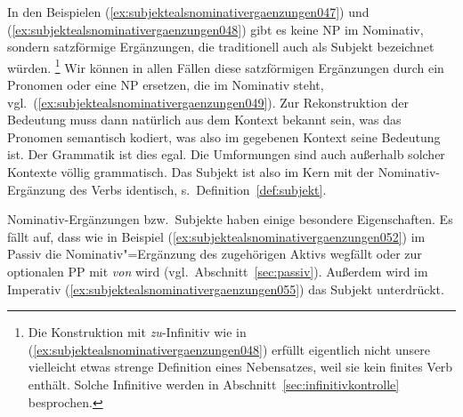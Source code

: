 In den Beispielen (\ref{ex:subjektealsnominativergaenzungen047}) und (\ref{ex:subjektealsnominativergaenzungen048}) gibt es keine NP im Nominativ, sondern satzförmige Ergänzungen, die traditionell auch als Subjekt bezeichnet würden.%
\footnote{Die Konstruktion mit \textit{zu}-Infinitiv wie in (\ref{ex:subjektealsnominativergaenzungen048}) erfüllt eigentlich nicht unsere vielleicht etwas strenge Definition eines Nebensatzes, weil sie kein finites Verb enthält.
Solche Infinitive werden in Abschnitt~\ref{sec:infinitivkontrolle} besprochen.}
Wir können in allen Fällen diese satzförmigen Ergänzungen durch ein Pronomen oder eine NP ersetzen, die im Nominativ steht, vgl.\ (\ref{ex:subjektealsnominativergaenzungen049}).
Zur Rekonstruktion der Bedeutung muss dann natürlich aus dem Kontext bekannt sein, was das Pronomen semantisch kodiert, was also im gegebenen Kontext seine Bedeutung ist.
Der Grammatik ist dies egal.
Die Umformungen sind auch außerhalb solcher Kontexte völlig grammatisch.
Das Subjekt ist also im Kern mit der Nominativ-Ergänzung des Verbs identisch, s.\ Definition~\ref{def:subjekt}.
\begin{exe}
  \ex\label{ex:subjektealsnominativergaenzungen049}
  \begin{xlist}
  \end{xlist}
\end{exe}




Nominativ-Ergänzungen bzw.\ Subjekte haben einige besondere Eigenschaften.
Es fällt auf, dass wie in Beispiel (\ref{ex:subjektealsnominativergaenzungen052}) im Passiv die Nominativ"=Ergänzung des zugehörigen Aktivs wegfällt oder zur optionalen PP mit \textit{von} wird (vgl.\ Abschnitt~\ref{sec:passiv}).
Außerdem wird im Imperativ (\ref{ex:subjektealsnominativergaenzungen055}) das Subjekt unterdrückt.

